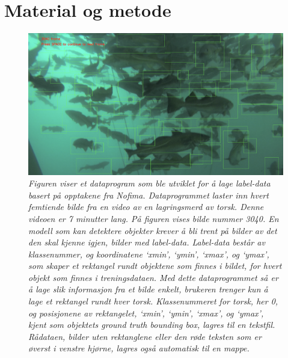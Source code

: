 


\section{Material og metode}

\begin{figure}[h!]
\begin{center} 
\includegraphics[scale=0.35]{figures/dataset_tool_2}
\caption{\small \sl Figuren viser et dataprogram som ble utviklet for å lage label-data basert på opptakene fra Nofima. Dataprogrammet laster inn hvert femtiende bilde fra en video av en lagringsmerd av torsk. Denne videoen er 7 minutter lang. På figuren vises bilde nummer 3040. En modell som kan detektere objekter krever å bli trent på bilder av det den skal kjenne igjen, bilder med label-data. Label-data består av klassenummer, og koordinatene `xmin', `ymin', `xmax', og `ymax', som skaper et rektangel rundt objektene som finnes i bildet, for hvert objekt som finnes i treningsdataen. Med dette dataprogrammet så er å lage slik informasjon fra et bilde enkelt, brukeren trenger kun å lage et rektangel rundt hver torsk. Klassenummeret for torsk, her 0, og posisjonene av rektangelet, `xmin', `ymin', `xmax', og `ymax', kjent som objektets ground truth bounding box, lagres til en tekstfil. Rådataen, bilder uten rektanglene eller den røde teksten som er øverst i venstre hjørne, lagres også automatisk til en mappe. \label{fig:dataset_tool}} 
\end{center} 
\end{figure} 

